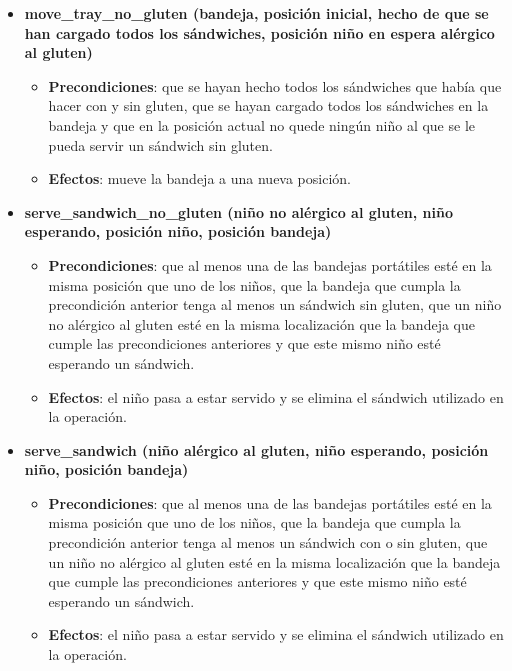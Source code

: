 \documentclass{article}
\begin{document}
\begin{itemize}
\begin{itemize}
            \end{itemize}                
        \item \textbf{move\_tray\_no\_gluten (bandeja, posición inicial, hecho de que se han cargado todos los sándwiches, posición niño en espera alérgico al gluten)}
            \begin{itemize}
                \item \textbf{Precondiciones}: que se hayan hecho todos los sándwiches que había que hacer con y sin gluten, que se hayan cargado todos los sándwiches en la bandeja y que en la posición actual no quede ningún niño al que se le pueda servir un sándwich sin gluten.
                \item \textbf{Efectos}: mueve la bandeja a una nueva posición.
            \end{itemize}                
        \item \textbf{serve\_sandwich\_no\_gluten (niño no alérgico al gluten, niño esperando, posición niño, posición bandeja)}
            \begin{itemize}
                \item \textbf{Precondiciones}: que al menos una de las bandejas portátiles esté en la misma posición que uno de los niños, que la bandeja que cumpla la precondición anterior tenga al menos un sándwich sin gluten, que un niño no alérgico al gluten esté en la misma localización que la bandeja que cumple las precondiciones anteriores y que este mismo niño esté esperando un sándwich.
                \item \textbf{Efectos}: el niño pasa a estar servido y se elimina el sándwich utilizado en la operación.
            \end{itemize}
        \item \textbf{serve\_sandwich (niño alérgico al gluten, niño esperando, posición niño, posición bandeja)}
            \begin{itemize}
                \item \textbf{Precondiciones}: que al menos una de las bandejas portátiles esté en la misma posición que uno de los niños, que la bandeja que cumpla la precondición anterior tenga al menos un sándwich con o sin gluten, que un niño no alérgico al gluten esté en la misma localización que la bandeja que cumple las precondiciones anteriores y que este mismo niño esté esperando un sándwich.
                \item \textbf{Efectos}: el niño pasa a estar servido y se elimina el sándwich utilizado en la operación.
            \end{itemize}
    \end{itemize}
    
\end{document}
